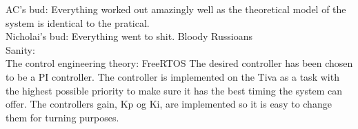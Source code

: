 \documentclass[../../main]{subfiles}
\begin{document}
AC's bud:
Everything worked out amazingly well as the theoretical model of the system is identical to the pratical. \\
Nicholai's bud:
Everything went to shit. Bloody Russioans
\\

Sanity:\\

The control engineering theory:
FreeRTOS
The desired controller has been chosen to be a PI controller. The controller is implemented on the Tiva as a task with the highest possible priority to make sure it has the best timing the system can offer. The controllers gain, Kp og Ki, are implemented so it is easy to change them for turning purposes.
\end{document}
